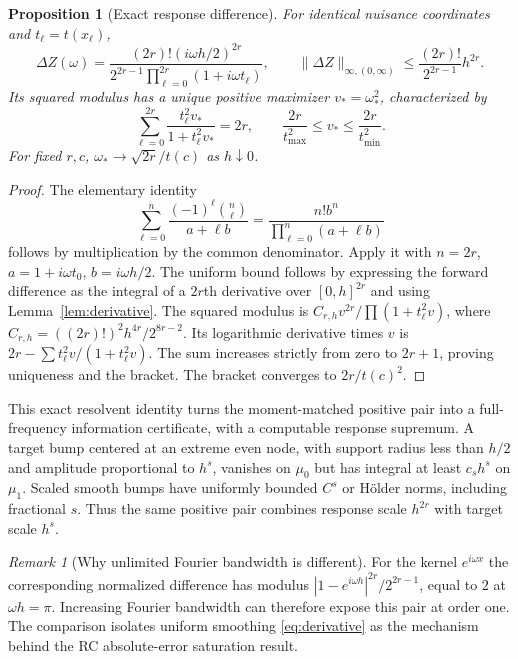 \documentclass[10pt]{amsart}
\newtheorem{proposition}[theorem]{Proposition}
\theoremstyle{definition}
\theoremstyle{remark}
\newtheorem{remark}[theorem]{Remark}
\theoremstyle{plain}
\begin{document}
\begin{proposition}[Exact response difference]\label{prop:identity}
For identical nuisance coordinates and $t_\ell=t(x_\ell)$,
\begin{equation}\label{eq:identity}
 \Delta Z(\omega)=\frac{(2r)!(i\omega h/2)^{2r}}
 {2^{2r-1}\prod_{\ell=0}^{2r}(1+i\omega t_\ell)},\qquad
 \|\Delta Z\|_{\infty,(0,\infty)}\le\frac{(2r)!}{2^{2r-1}}h^{2r}.
\end{equation}
Its squared modulus has a unique positive maximizer $v_*=\omega_*^2$, characterized by
\begin{equation}\label{eq:maximizer}
 \sum_{\ell=0}^{2r}\frac{t_\ell^2v_*}{1+t_\ell^2v_*}=2r,
 \qquad \frac{2r}{t_{\max}^2}\le v_*\le\frac{2r}{t_{\min}^2}.
\end{equation}
For fixed $r,c$, $\omega_*\to\sqrt{2r}/t(c)$ as $h\downarrow0$.
\end{proposition}
\begin{proof}
The elementary identity
\[
 \sum_{\ell=0}^n\frac{(-1)^\ell\binom n\ell}{a+\ell b}
 =\frac{n!b^n}{\prod_{\ell=0}^n(a+\ell b)}
\]
follows by multiplication by the common denominator. Apply it with $n=2r$, $a=1+i\omega t_0$, $b=i\omega h/2$. The uniform bound follows by expressing the forward difference as the integral of a $2r$th derivative over $[0,h]^{2r}$ and using Lemma~\ref{lem:derivative}. The squared modulus is $C_{r,h}v^{2r}/\prod(1+t_\ell^2v)$, where $C_{r,h}=((2r)!)^2h^{4r}/2^{8r-2}$. Its logarithmic derivative times $v$ is $2r-\sum t_\ell^2v/(1+t_\ell^2v)$. The sum increases strictly from zero to $2r+1$, proving uniqueness and the bracket. The bracket converges to $2r/t(c)^2$.
\end{proof}

This exact resolvent identity turns the moment-matched positive pair into a full-frequency information certificate, with a computable response supremum. A target bump centered at an extreme even node, with support radius less than $h/2$ and amplitude proportional to $h^s$, vanishes on $\mu_0$ but has integral at least $c_sh^s$ on $\mu_1$. Scaled smooth bumps have uniformly bounded $C^s$ or H\"older norms, including fractional $s$. Thus the same positive pair combines response scale $h^{2r}$ with target scale $h^s$.

\begin{remark}[Why unlimited Fourier bandwidth is different]\label{rem:fourier}
For the kernel $e^{i\omega x}$ the corresponding normalized difference has modulus $|1-e^{i\omega h}|^{2r}/2^{2r-1}$, equal to $2$ at $\omega h=\pi$. Increasing Fourier bandwidth can therefore expose this pair at order one. The comparison isolates uniform smoothing \eqref{eq:derivative} as the mechanism behind the RC absolute-error saturation result.
\end{remark}
\end{document}
